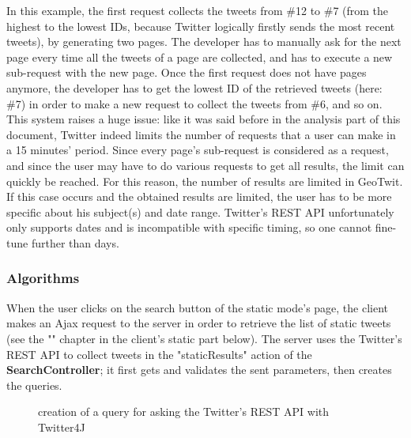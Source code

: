 \documentclass[a4paper,11pt]{report}
\begin{document}
In this example, the first request collects the tweets from \#12 to \#7 (from the highest to the lowest IDs, because Twitter logically firstly sends the most recent tweets), by generating two pages. The developer has to manually ask for the next page every time all the tweets of a page are collected, and has to execute a new sub-request with the new page. Once the first request does not have pages anymore, the developer has to get the lowest ID of the retrieved tweets (here: \#7) in order to make a new request to collect the tweets from \#6, and so on.\\

This system raises a huge issue: like it was said before in the analysis part of this document, Twitter indeed limits the number of requests that a user can make in a 15 minutes' period. Since every page's sub-request is considered as a request, and since the user may have to do various requests to get all results, the limit can quickly be reached. For this reason, the number of results are limited in GeoTwit.\\

If this case occurs and the obtained results are limited, the user has to be more specific about his subject(s) and date range. Twitter's REST API unfortunately only supports dates and is incompatible with specific timing, so one cannot fine-tune further than days.

\subsubsection{Algorithms}
When the user clicks on the search button of the static mode's page, the client makes an Ajax request to the server in order to retrieve the list of static tweets (see the "" chapter in the client's static part below). The server uses the Twitter's REST API to collect tweets in the "staticResults" action of the \textbf{SearchController}; it first gets and validates the sent parameters, then creates the queries.
\begin{figure}[H]
\vspace{-5pt}
\begin{center}
\vspace{-5pt}
\caption{creation of a query for asking the Twitter's REST API with Twitter4J}
\end{center}
\end{figure}
\end{document}
